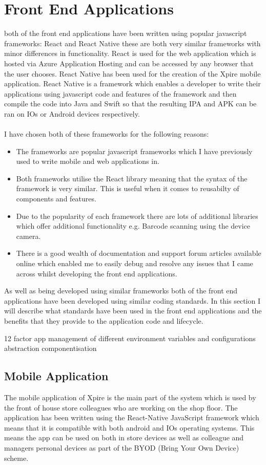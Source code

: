 \documentclass[a4paper,11pt]{report}
\begin{document}
\section{Front End Applications}
both of the front end applications have been written using popular javascript frameworks: React and React 
Native these are both very similar frameworks with minor differences in functionality. React is used for 
the web application which is hosted via Azure Application Hosting and can be accessed by any browser that
the user chooses. React Native has been used for the creation of the Xpire mobile application. React Native
is a framework which enables a developer to write their applications using javascript code and features of
the framework and then compile the code into Java and Swift so that the resulting IPA and APK can be ran 
on IOs or Android devices respectively.
\\
\\
I have chosen both of these frameworks for the following reasons:
\begin{itemize}
    \item The frameworks are popular javascript frameworks which I have previously used to write mobile and web applications in.
    \item Both frameworks utilise the React library meaning that the syntax of the framework is very similar. This is useful 
    when it comes to reusabilty of components and features. 
    \item Due to the popularity of each framework there are lots of additional libraries which offer additional functionality
     e.g. Barcode scanning using the device camera.
    \item There is a good wealth of documentation and support forum articles available online which enabled me to easily debug 
    and resolve any issues that I came across whilst developing the front end applications.
\end{itemize}

As well as being developed using similar frameworks both of the front end applications have been developed using similar coding standards.
 In this section I will describe what standards have been used in the front end applications and the benefits that they provide to the application code and lifecycle.

12 factor app
management of different environment variables and configurations
abstraction
componentisation

\subsection{Mobile Application}
The mobile application of Xpire is the main part of the system which is used by the front of house store colleagues who are working on the shop floor.
The application has been written using the React-Native JavaScript framework which means that it is compatible with both android and IOs operating systems.
This means the app can be used on both in store devices as well as colleague and managers personal devices as part of the BYOD (Bring Your Own Device) scheme. 
\end{document}
